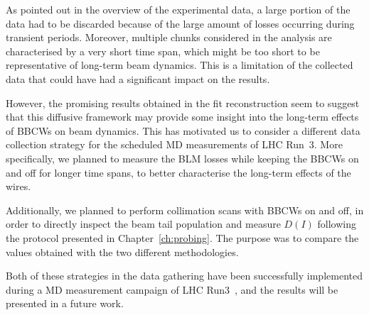 As pointed out in the overview of the experimental data, a large portion of the data had to be discarded because of the large amount of losses occurring during transient periods. Moreover, multiple chunks considered in the analysis are characterised by a very short time span, which might be too short to be representative of long-term beam dynamics. This is a limitation of the collected data that could have had a significant impact on the results.

However, the promising results obtained in the fit reconstruction seem to suggest that this diffusive framework may provide some insight into the long-term effects of BBCWs on beam dynamics. This has motivated us to consider a different data collection strategy for the scheduled MD measurements of LHC Run~3. More specifically, we planned to measure the BLM losses while keeping the BBCWs on and off for longer time spans, to better characterise the long-term effects of the wires.

Additionally, we planned to perform collimation scans with BBCWs on and off, in order to directly inspect the beam tail population and measure $D(I)$ following the protocol presented in Chapter~\ref{ch:probing}. The purpose was to compare the values obtained with the two different methodologies.

Both of these strategies in the data gathering have been successfully implemented during a MD measurement campaign of LHC Run3~\cite{}, and the results will be presented in a future work.